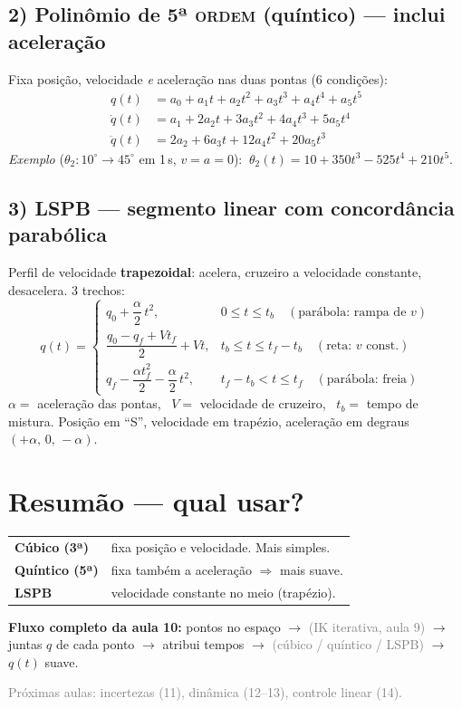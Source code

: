 \documentclass[11pt,a4paper]{article}
\newcommand{\aula}[1]{{\small\textcolor{gray}{(#1)}}}
\begin{document}
\subsection*{2) Polinômio de \textsc{5ª ordem} (quíntico) — inclui aceleração}
Fixa posição, velocidade \emph{e} aceleração nas duas pontas (6 condições):
\[
\begin{aligned}
q(t)  &= a_0+a_1 t+a_2 t^2+a_3 t^3+a_4 t^4+a_5 t^5\\
\dot q(t) &= a_1+2a_2 t+3a_3 t^2+4a_4 t^3+5a_5 t^4\\
\ddot q(t) &= 2a_2+6a_3 t+12a_4 t^2+20a_5 t^3
\end{aligned}
\]
\textit{Exemplo} ($\theta_2:10^\circ\!\to\!45^\circ$ em 1\,s, $v=a=0$):
$\ \theta_2(t)=10+350t^3-525t^4+210t^5$.

\subsection*{3) LSPB — segmento linear com concordância parabólica}
Perfil de velocidade \textbf{trapezoidal}: acelera, cruzeiro a velocidade
constante, desacelera. 3 trechos:
\[
q(t)=
\begin{cases}
q_0+\dfrac{\alpha}{2}\,t^2, & 0\le t\le t_b \quad(\text{parábola: rampa de }v)\\[8pt]
\dfrac{q_0-q_f+V t_f}{2}+V t, & t_b\le t\le t_f-t_b \quad(\text{reta: }v\text{ const.})\\[8pt]
q_f-\dfrac{\alpha t_f^2}{2}-\dfrac{\alpha}{2}\,t^2, & t_f-t_b< t\le t_f \quad(\text{parábola: freia})
\end{cases}
\]
$\alpha=$ aceleração das pontas, \ $V=$ velocidade de cruzeiro, \ $t_b=$ tempo
de mistura. Posição em ``S'', velocidade em trapézio, aceleração em degraus
$(+\alpha,\,0,\,-\alpha)$.

\section*{\textcolor{laranja}{Resumão — qual usar?}}
\begin{tcolorbox}[colback=azul!5,colframe=azul!40]
\begin{tabular}{ll}
\textcolor{azul}{\textbf{Cúbico (3ª)}}   & fixa posição e velocidade. Mais simples.\\
\textcolor{vinho}{\textbf{Quíntico (5ª)}} & fixa também a aceleração $\Rightarrow$ mais suave.\\
\textcolor{verde}{\textbf{LSPB}}          & velocidade constante no meio (trapézio).\\
\end{tabular}
\end{tcolorbox}

\noindent\textbf{Fluxo completo da aula 10:}
pontos no espaço $\to$ \aula{IK iterativa, aula 9} $\to$ juntas $q$ de cada
ponto $\to$ atribui tempos $\to$ \aula{cúbico / quíntico / LSPB} $\to$
$q(t)$ suave. \checkmark

\vspace{4pt}
{\small\textcolor{gray}{Próximas aulas: incertezas (11), dinâmica (12--13),
controle linear (14).}}
\end{document}
